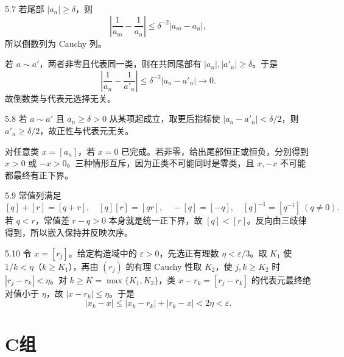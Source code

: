 \begin{solution}{5.7}
若尾部 \(|a_n|\ge\delta\)，则
\[
 \left|\frac1{a_m}-\frac1{a_n}\right|
 \le\delta^{-2}|a_m-a_n|,
\]
所以倒数列为 Cauchy 列。

若 \(a\sim a'\)，两者非零且代表同一类，则在共同尾部有 \(|a_n|,|a'_n|\ge\delta\)。于是
\[
 \left|\frac1{a_n}-\frac1{a'_n}\right|
 \le\delta^{-2}|a_n-a'_n|\longrightarrow0.
\]
故倒数类与代表元选择无关。
\end{solution}

\begin{solution}{5.8}
若 \(a\sim a'\) 且 \(a_n\ge\delta>0\) 从某项起成立，取更后指标使 \(|a_n-a'_n|<\delta/2\)，则 \(a'_n\ge\delta/2\)，故正性与代表元无关。

对任意类 \(x=[a_n]\)，若 \(x=0\) 已完成。若非零，给出尾部恒正或恒负，分别得到 \(x>0\) 或 \(-x>0\)。三种情形互斥，因为正类不可能同时是零类，且 \(x,-x\) 不可能都最终有正下界。
\end{solution}

\begin{solution}{5.9}
常值列满足
\[
 [q]+[r]=[q+r],\quad [q][r]=[qr],\quad
 -[q]=[-q],\quad [q]^{-1}=[q^{-1}]\ (q\ne0).
\]
若 \(q<r\)，常值差 \(r-q>0\) 本身就是统一正下界，故 \([q]<[r]\)。反向由三歧律得到，所以嵌入保持并反映次序。
\end{solution}

\begin{solution}{5.10}
令 \(x=[r_j]\)。给定构造域中的 \(\varepsilon>0\)，先选正有理数 \(\eta<\varepsilon/3\)。取 \(K_1\) 使 \(1/k<\eta\)（\(k\ge K_1\)），再由 \((r_j)\) 的有理 Cauchy 性取 \(K_2\)，使 \(j,k\ge K_2\) 时 \(|r_j-r_k|<\eta\)。对 \(k\ge K=\max\{K_1,K_2\}\)，类 \(x-r_k=[r_j-r_k]\) 的代表元最终绝对值小于 \(\eta\)，故 \(|x-r_k|\le\eta\)。于是
\[
 |x_k-x|\le|x_k-r_k|+|r_k-x|<2\eta<\varepsilon.
\]
\end{solution}

\section*{C组}

